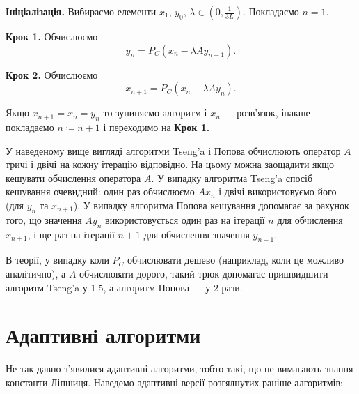 \begin{algorithm}[Попов]
    \label{algo:popov}
    \textbf{Ініціалізація.} Вибираємо елементи $x_1$, $y_0$, $\lambda \in \left( 0, \frac{1}{3L} \right)$. Покладаємо $n = 1$. \medskip

    \textbf{Крок 1.} Обчислюємо
    \begin{equation}
        y_n = P_C (x_n - \lambda A y_{n - 1}).
    \end{equation}
    
    \textbf{Крок 2.} Обчислюємо
    \begin{equation}
        x_{n + 1} = P_C (x_n - \lambda A y_n).
    \end{equation}
    
    Якщо $x_{n + 1} = x_n = y_n$ то зупиняємо алгоритм і $x_n$ --- розв'язок, інакше покладаємо $n \coloneqq n + 1$ і переходимо на \textbf{Крок 1.}
\end{algorithm}

\begin{remark}
    У наведеному вище вигляді алгоритми Tseng'a і Попова обчислюють оператор $A$ тричі і двічі на кожну ітерацію відповідно. На цьому можна заощадити якщо кешувати обчислення оператора $A$. У випадку алгоритма Tseng'a спосіб кешування очевидний: один раз обчислюємо $A x_n$ і двічі використовуємо його (для $y_n$ та $x_{n + 1}$). У випадку алгоритма Попова кешування допомагає за рахунок того, що значення $A y_n$ використовується один раз на ітерації $n$ для обчислення $x_{n + 1}$, і ще раз на ітерації $n + 1$ для обчислення значення $y_{n + 1}$. \medskip
    
    В теорії, у випадку коли $P_C$ обчислювати дешево (наприклад, коли це можливо аналітично), а $A$ обчислювати дорого, такий трюк допомагає пришвидшити алгоритм Tseng'a у 1.5, а алгоритм Попова --- у 2 рази.
\end{remark}


\section{Адаптивні алгоритми}

Не так давно з'явилися адаптивні алгоритми, тобто такі, що не вимагають знання константи Ліпшиця. Наведемо адаптивні версії розгялнутих раніше алгоритмів:

